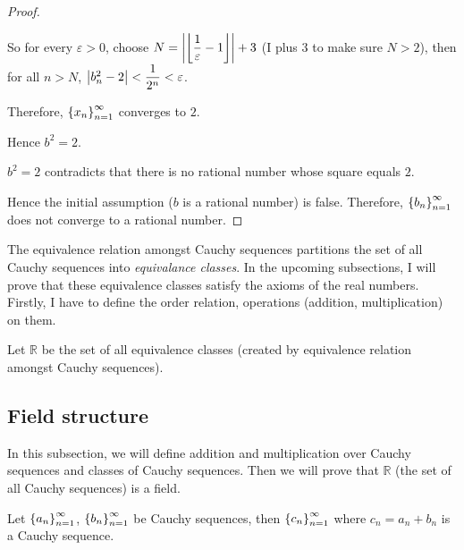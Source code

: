 \begin{proof}
\begin{enumerate}[label={\textbf{Step \arabic*.}},itemindent=1cm]
              So for every $\varepsilon > 0$, choose $N = \left\vert{\left\lfloor{\dfrac{1}{\varepsilon} - 1}\right\rfloor}\right\vert + 3$ (I plus 3 to make sure $N > 2$), then for all $n > N$, $\left\vert{b^{2}_{n} - 2}\right\vert < \dfrac{1}{2^{n}} < \varepsilon$.

              Therefore, ${\left\{{x_{n}}\right\}}^{\infty}_{n=1}$ converges to $2$.

              Hence $b^{2} = 2$.
    \end{enumerate}

    $b^{2} = 2$ contradicts that there is no rational number whose square equals $2$.

    Hence the initial assumption ($b$ is a rational number) is false. Therefore, ${\left\{{b_{n}}\right\}}^{\infty}_{n=1}$ does not converge to a rational number.
\end{proof}

The equivalence relation amongst Cauchy sequences partitions the set of all Cauchy sequences into \textit{equivalance classes}. In the upcoming subsections, I will prove that these equivalence classes satisfy the axioms of the real numbers. Firstly, I have to define the order relation, operations (addition, multiplication) on them.

Let $\mathbb{R}$ be the set of all equivalence classes (created by equivalence relation amongst Cauchy sequences).

\subsection{Field structure}

In this subsection, we will define addition and multiplication over Cauchy sequences and classes of Cauchy sequences. Then we will prove that $\mathbb{R}$ (the set of all Cauchy sequences) is a field.

\begin{theorem}\label{theorem:chapter1:sum-of-cauchy-sequences}
    Let ${\left\{{a_{n}}\right\}}^{\infty}_{n=1}$, ${\left\{{b_{n}}\right\}}^{\infty}_{n=1}$ be Cauchy sequences, then ${\left\{{c_{n}}\right\}}^{\infty}_{n=1}$ where $c_{n} = a_{n} + b_{n}$ is a Cauchy sequence.
\end{theorem}

